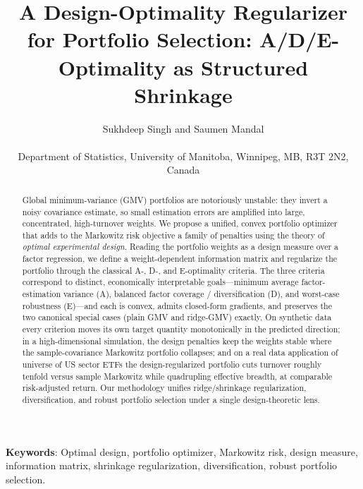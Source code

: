 \documentclass[11pt]{article}
\title{\bfseries A Design-Optimality Regularizer for Portfolio Selection: 
  A/D/E-Optimality as Structured Shrinkage}
\author{Sukhdeep Singh and Saumen Mandal \\ \\
Department of Statistics, University of Manitoba, Winnipeg, MB, R3T 2N2, Canada}
\date{}
\newcommand{\diag}{\operatorname{diag}}
\newcommand{\w}{\mathbf{w}}
\newcommand{\M}{M(\w)}
\begin{document}
\maketitle

\begin{abstract}
Global minimum-variance (GMV) portfolios are notoriously unstable: they invert a
noisy covariance estimate, so small estimation errors are amplified into large,
concentrated, high-turnover weights. We propose a unified, convex portfolio
optimizer that adds to the Markowitz risk objective a family of penalties
using the theory of \emph{optimal experimental design}. Reading the portfolio weights
as a design measure over a factor regression, we define a weight-dependent
information matrix 
and regularize the portfolio through the
classical A-, D-, and E-optimality criteria. The three criteria
correspond to distinct, economically interpretable goals---minimum average
factor-estimation variance (A), balanced factor coverage / diversification (D),
and worst-case robustness (E)---and each is convex, admits closed-form
gradients, and preserves the two canonical special cases (plain GMV and
ridge-GMV) exactly. On synthetic data every criterion moves its own target
quantity monotonically in the predicted direction; in a high-dimensional simulation, 
the design penalties keep the weights stable where the
sample-covariance Markowitz portfolio collapses; and on a real data application of universe of US
sector ETFs the design-regularized portfolio cuts turnover roughly tenfold
versus sample Markowitz while quadrupling effective breadth, at comparable
risk-adjusted return. Our methodology unifies ridge/shrinkage regularization,
diversification, and robust portfolio selection under a single design-theoretic
lens.
\end{abstract}

\vspace{0.2cm}

{\bf Keywords}: 
Optimal design, portfolio optimizer, Markowitz risk, design measure, information matrix, shrinkage regularization, diversification, robust portfolio selection.

\end{document}
